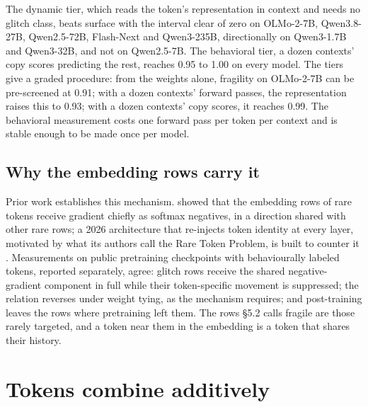 \documentclass[11pt]{article}
\begin{document}
The dynamic tier, which reads the token's representation in context and needs no glitch class, beats surface with the interval clear of zero on OLMo-2-7B, Qwen3.8-27B, Qwen2.5-72B, Flash-Next and Qwen3-235B, directionally on Qwen3-1.7B and Qwen3-32B, and not on Qwen2.5-7B. The behavioral tier, a dozen contexts' copy scores predicting the rest, reaches 0.95 to 1.00 on every model. The tiers give a graded procedure: from the weights alone, fragility on OLMo-2-7B can be pre-screened at 0.91; with a dozen contexts' forward passes, the representation raises this to 0.93; with a dozen contexts' copy scores, it reaches 0.99. The behavioral measurement costs one forward pass per token per context and is stable enough to be made once per model.

\subsection{Why the embedding rows carry it}\label{why-the-embedding-rows-carry-it}

Prior work establishes this mechanism. \citet{yu2022} showed that the embedding rows of rare tokens receive gradient chiefly as softmax negatives, in a direction shared with other rare rows; a 2026 architecture that re-injects token identity at every layer, motivated by what its authors call the Rare Token Problem, is built to counter it \citep{jaiswal2026}. Measurements on public pretraining checkpoints with behaviourally labeled tokens, reported separately, agree: glitch rows receive the shared negative-gradient component in full while their token-specific movement is suppressed; the relation reverses under weight tying, as the mechanism requires; and post-training leaves the rows where pretraining left them. The rows §5.2 calls fragile are those rarely targeted, and a token near them in the embedding is a token that shares their history.

\section{Tokens combine additively}\label{tokens-combine-additively}
\end{document}
